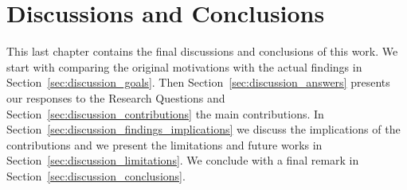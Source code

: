 \chapter{\statusgreen Discussions and Conclusions}
\label{chap:discussion}


This last chapter contains the final discussions and conclusions of this work.
We start with comparing the original motivations with the actual findings in Section~\ref{sec:discussion_goals}.
Then Section~\ref{sec:discussion_answers} presents our responses to the Research Questions and Section~\ref{sec:discussion_contributions} the main contributions.
In Section~\ref{sec:discussion_findings_implications} we discuss the implications of the contributions and we present the limitations and future works in Section~\ref{sec:discussion_limitations}.
We conclude with a final remark in Section~\ref{sec:discussion_conclusions}.














